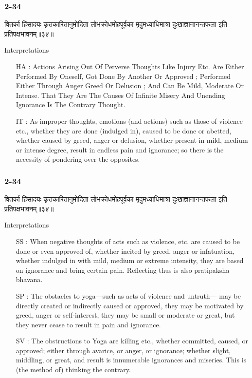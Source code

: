 \begin{frame}[fragile]\frametitle{2-34}
\begin{sanskrit}
वितर्का हिंसादयः कृतकारितानुमोदिता लोभक्रोधमोहपूर्वका मृदुमध्याधिमात्रा दुःखाज्ञानानन्तफला इति प्रतिपक्षभावनम्॥३४॥
\end{sanskrit}

Interpretations
\begin{itemize}
\item [HA]: Actions Arising Out Of Perverse Thoughts Like Injury Etc. Are Either Performed By Oneself, Got Done By Another Or Approved ; Performed Either Through Anger Greed Or Delusion ; And Can Be Mild, Moderate Or Intense. That They Are The Causes Of Infinite Misery And Unending Ignorance Is The Contrary Thought.
\item [IT]: As improper thoughts, emotions (and actions) such as those of violence etc., whether they are done (indulged in), caused to be done or abetted, whether caused by greed, anger or delusion, whether present in mild, medium or intense degree, result in endless pain and ignorance; so there is the necessity of pondering over the opposites.		
\end{itemize}
\end{frame}


\begin{frame}[fragile]\frametitle{2-34}
\begin{sanskrit}
वितर्का हिंसादयः कृतकारितानुमोदिता लोभक्रोधमोहपूर्वका मृदुमध्याधिमात्रा दुःखाज्ञानानन्तफला इति प्रतिपक्षभावनम्॥३४॥
\end{sanskrit}

Interpretations
\begin{itemize}
\item [SS]: When negative thoughts of acts such as violence, etc. are caused to be done or even approved of, whether incited by greed, anger or infatuation, whether indulged in with mild, medium or extreme intensity, they are based on ignorance and bring certain pain. Reflecting thus is also pratipaksha bhavana.
\item [SP]: The obstacles to yoga—such as acts of violence and untruth— may be directly created or indirectly caused or approved, they may be motivated by greed, anger or self-interest, they may be small or moderate or great, but they never cease to result in pain and ignorance.
\item [SV]: The obstructions to Yoga are killing etc., whether committed, caused, or approved; either through avarice, or anger, or ignorance; whether slight, middling, or great, and result is innumerable ignorances and miseries. This is (the method of) thinking the contrary. 
\end{itemize}
\end{frame}

